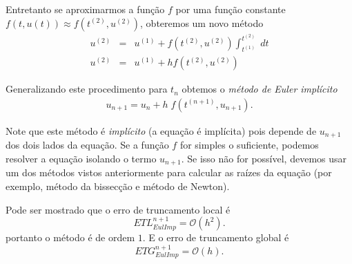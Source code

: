 Entretanto se aproximarmos a função $f$ por uma função constante $f(t,u(t)) \approx  f(t^{(2)},u^{(2)})$, obteremos um novo método
\begin{eqnarray}
  u^{(2)} &=&  u^{(1)} + f(t^{(2)},u^{(2)}) \int _{t^{(1)}}^{t^{(2)}}  \; dt \\
  u^{(2)} &=&  u^{(1)} + h f(t^{(2)},u^{(2)})
\end{eqnarray}


Generalizando este procedimento para $t_n$ obtemos o \emph{método de Euler implícito}
\begin{eqnarray}
u_{n+1}=u_n + h\;f(t^{(n+1)},u_{n+1}).
\end{eqnarray}

Note que este método é \emph{implícito} (a equação é implícita) pois depende de $u_{n+1}$ dos dois lados da equação. Se a função $f$ for simples o suficiente, podemos resolver a equação isolando o termo $u_{n+1}$. Se isso não for possível, devemos usar um dos métodos vistos anteriormente para calcular as raízes da equação (por exemplo, método da bissecção e método de Newton).



Pode ser mostrado que o erro de truncamento local é
$$ETL_{EulImp}^{n+1}= \mathcal{O}(h^2).$$
portanto o método é de ordem $1$. E o erro de truncamento global é
$$ETG_{EulImp}^{n+1}= \mathcal{O}(h).$$



